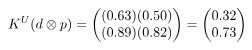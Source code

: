 \documentclass[preview]{standalone}
\begin{document}
\begin{align*}
\special{dvisvgm:raw <g id='unique000'>}K^U(d \otimes p) = \begin{pmatrix} (0.63)(0.50) \\ (0.89)(0.82) \end{pmatrix} = \begin{pmatrix} 0.32 \\ 0.73 \end{pmatrix}\special{dvisvgm:raw </g>}
\end{align*}
\end{document}
